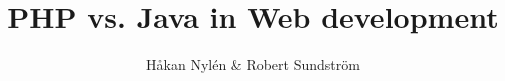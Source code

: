 \documentclass{urithesis}
\begin{document}
\title{PHP vs. Java in Web development}

\author{Håkan Nylén & Robert Sundström}





\nocite{re:toolan:as03}
\end{document}
